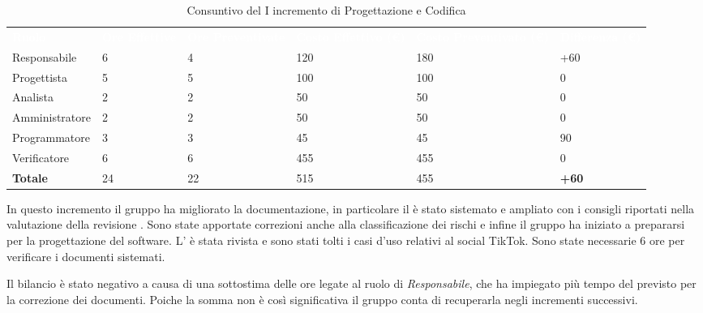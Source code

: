 \begin{table}[H]
\begin{center}
\renewcommand{\arraystretch}{1.5}
\begin{tabular}{ m{}<{\centering}  m{}<{\centering} m{}<{\centering} m{}<{\centering} m{}<{\centering} m{}<{\centering}}
	\rowcolor{darkblue}
	\textcolor{white}{\textbf{Ruolo}} & \textcolor{white}{\textbf{Ore Effettive}} & \textcolor{white}{\textbf{Ore Preventivate}}&\textcolor{white}{\textbf{Costo Effettivo (\euro)}}&\textcolor{white}{\textbf{Costo Preventivato (\euro)}}&\textcolor{white}{\textbf{Differenza (\euro)}}\\ 

	Responsabile  & 6 & 4 & 120 & 180 & +60\\	
	
	Progettista & 5 & 5 & 100 & 100 & 0\\
	
	Analista & 2 & 2 & 50 & 50 & 0\\
	
	Amministratore & 2 & 2 & 50 & 50 & 0\\
	
	Programmatore & 3 & 3 & 45 & 45 & 90\\
	
	Verificatore & 6 & 6 & 455 & 455 & 0\\
	
	\textbf{Totale} & 24 & 22 & 515 & 455 & \textbf{+60} \\
	
\end{tabular}
\caption{Consuntivo del I incremento di Progettazione e Codifica}
\end{center}
\end{table}

In questo incremento il gruppo ha migliorato la documentazione, in particolare il \PdP{} è stato sistemato e ampliato con i consigli riportati nella valutazione della revisione \RTB{}. Sono state apportate correzioni anche alla classificazione dei rischi e infine il gruppo ha iniziato a prepararsi per la progettazione del software.
L'\AdR{} è stata rivista e sono stati tolti i casi d'uso relativi al social TikTok.
Sono state necessarie 6 ore per verificare i documenti sistemati.

Il bilancio è stato negativo a causa di una sottostima delle ore legate al ruolo di \textit{Responsabile}, che ha impiegato più tempo del previsto per la correzione dei documenti. Poiche la somma non è così significativa il gruppo conta di recuperarla negli incrementi successivi.

